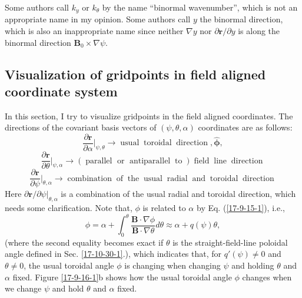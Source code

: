 \documentclass{llncs}
\newcommand{\infixor}{\text{ or }}
\newcommand{\nobracket}{}
\newcommand{\tmmathbf}[1]{\ensuremath{\boldsymbol{#1}}}
\newcommand{\tmop}[1]{\ensuremath{\operatorname{#1}}}
\begin{document}
Some authors call $k_y$ or $k_{\theta}$ by the name ``binormal wavenumber'',
which is not an appropriate name in my opinion. Some authors call $y$ the
binormal direction, which is also an inappropriate name since neither $\nabla
y$ nor $\partial \mathbf{r}/ \partial y$ is along the binormal direction
$\mathbf{B}_0 \times \nabla \psi$.

\subsection{Visualization of gridpoints in field aligned coordinate system}

In this section, I try to visualize gridpoints in the field aligned
coordinates. The directions of the covariant basis vectors of $(\psi, \theta,
\alpha)$ coordinates are as follows:
\begin{equation}
  \frac{\partial \mathbf{r}}{\partial \alpha} |_{\psi, \theta} \nobracket
  \longrightarrow \tmop{usual} \tmop{toroidal} \tmop{direction},
  \hat{\tmmathbf{\phi}},
\end{equation}
\begin{equation}
  \frac{\partial \mathbf{r}}{\partial \theta} |_{\psi, \alpha} \nobracket
  \longrightarrow \left( \tmop{parallel} \infixor \tmop{antiparallel}
  \tmop{to} \right) \tmop{field} \tmop{line} \tmop{direction}
\end{equation}
\begin{equation}
  \frac{\partial \mathbf{r}}{\partial \psi} |_{\theta, \alpha} \nobracket
  \longrightarrow \tmop{combination} \tmop{of} \tmop{the} \tmop{usual}
  \tmop{radial} \tmop{and} \tmop{toroidal} \tmop{direction}
\end{equation}
Here $\partial \mathbf{r}/ \partial \psi |_{\theta, \alpha} \nobracket$ is a
combination of the usual radial and toroidal direction, which needs some
clarification. Note that, $\phi$ is related to $\alpha$ by Eq.
(\ref{17-9-15-1}), i.e.,
\begin{equation}
  \label{17-10-30-2} \phi = \alpha + \int_0^{\theta} \frac{\mathbf{B} \cdot
  \nabla \phi}{\mathbf{B} \cdot \nabla \theta} d \theta \approx \alpha + q
  (\psi) \theta,
\end{equation}
(where the second equality becomes exact if $\theta$ is the
straight-field-line poloidal angle defined in Sec. \ref{17-10-30-1}.), which
indicates that, for $q' (\psi) \neq 0$ and $\theta \neq 0$, the usual toroidal
angle $\phi$ is changing when changing $\psi$ and holding $\theta$ and
$\alpha$ fixed. Figure \ref{17-9-16-1}b shows how the usual toroidal angle
$\phi$ changes when we change $\psi$ and hold $\theta$ and $\alpha$ fixed.
\end{document}
